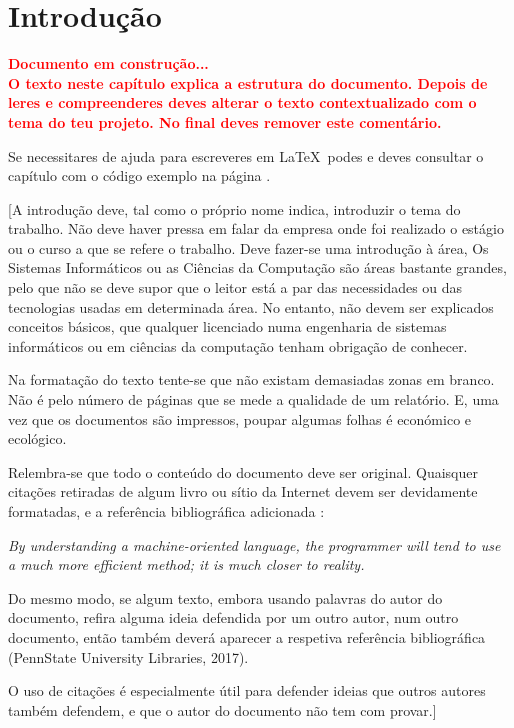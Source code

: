 
\chapter{Introdução}\label{key:introducao}

\textbf{\textcolor{Red}{Documento em construção... \\O texto neste capítulo explica a estrutura do documento. Depois de leres e compreenderes deves alterar o texto contextualizado com o tema do teu projeto. No final deves remover este comentário.}}


Se necessitares de ajuda para escreveres em \LaTeX\ podes e deves consultar o capítulo com o código exemplo na página \pageref{key:latexsample}.

[A introdução deve, tal como o próprio nome indica, introduzir o tema do trabalho. Não deve haver pressa em falar da empresa onde foi realizado o estágio ou o curso a que se refere o trabalho. Deve fazer-se uma introdução à área, Os Sistemas Informáticos ou as Ciências da Computação são áreas bastante grandes, pelo que não se deve supor que o leitor está a par das necessidades ou das tecnologias usadas em determinada área. No entanto, não devem ser explicados conceitos básicos, que qualquer licenciado numa engenharia de sistemas informáticos ou em ciências da computação tenham obrigação de conhecer.

Na formatação do texto tente-se que não existam demasiadas zonas em branco. Não é pelo número de páginas que se mede a qualidade de um relatório. E, uma vez que os documentos são impressos, poupar algumas folhas é económico e ecológico. 

Relembra-se que todo o conteúdo do documento deve ser original. Quaisquer citações retiradas de algum livro ou sítio da Internet devem ser devidamente formatadas, e a referência bibliográfica adicionada \citep{knuth1973}:

\emph{By understanding a machine-oriented language, the programmer will tend to use a much more efficient method; it is much closer to reality. }

Do mesmo modo, se algum texto, embora usando palavras do autor do documento, refira alguma ideia defendida por um outro autor, num outro documento, então também deverá aparecer a respetiva referência bibliográfica (PennState University Libraries, 2017). 

O uso de citações é especialmente útil para defender ideias que outros autores também defendem, e que o autor do documento não tem com provar.] 

